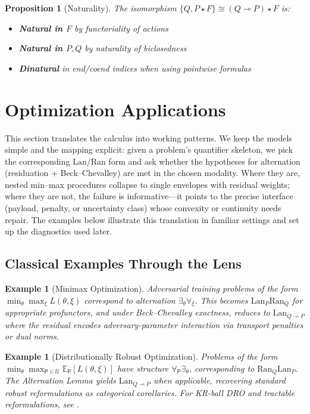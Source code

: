 \documentclass[11pt]{article}
\numberwithin{equation}{section}
\theoremstyle{upright}
\newtheorem{proposition}{Proposition}
\newtheorem{example}[theorem]{Example}
\newcommand{\Lan}{\mathrm{Lan}}
\newcommand{\Ran}{\mathrm{Ran}}
\newcommand{\BC}{Beck--Chevalley}
\begin{document}
\begin{proposition}[Naturality]
The isomorphism $\{Q, P \star F\} \cong (Q \multimap P) \star F$ is:
\begin{itemize}[itemsep=0.5ex]
\item \textbf{Natural in $F$} by functoriality of actions
\item \textbf{Natural in $P, Q$} by naturality of biclosedness  
\item \textbf{Dinatural} in end/coend indices when using pointwise formulas
\end{itemize}
\end{proposition}

\section{Optimization Applications}\label{sec:opt-apps}

This section translates the calculus into working patterns. We keep the models simple and the mapping explicit: given a problem’s quantifier skeleton, we pick the corresponding $\Lan/\Ran$ form and ask whether the hypotheses for alternation (residuation + \BC{}) are met in the chosen modality. Where they are, nested min–max procedures collapse to single envelopes with residual weights; where they are not, the failure is informative—it points to the precise interface (payload, penalty, or uncertainty class) whose convexity or continuity needs repair. The examples below illustrate this translation in familiar settings and set up the diagnostics used later.

\subsection{Classical Examples Through the Lens}

\begin{example}[Minimax Optimization]
Adversarial training problems of the form $\min_\theta \max_\xi L(\theta, \xi)$ correspond to alternation $\exists_\theta \forall_\xi$. This becomes $\Lan_P \Ran_Q$ for appropriate profunctors, and under Beck--Chevalley exactness, reduces to $\Lan_{Q \multimap P}$ where the residual encodes adversary-parameter interaction via transport penalties or dual norms.
\end{example}

\begin{example}[Distributionally Robust Optimization]  
Problems of the form $\min_\theta \max_{\mathsf{P} \in \mathcal{U}} \mathbb{E}_{\mathsf{P}}[L(\theta, \xi)]$ have structure $\forall_{\mathsf{P}} \exists_\theta$, corresponding to $\Ran_Q \Lan_P$. The Alternation Lemma yields $\Lan_{Q \multimap P}$ when applicable, recovering standard robust reformulations as categorical corollaries. For KR-ball DRO and tractable reformulations, see \cite{EsfahaniKuhn2018,ShafieeAbadeh2015}.
\end{example}
\end{document}
